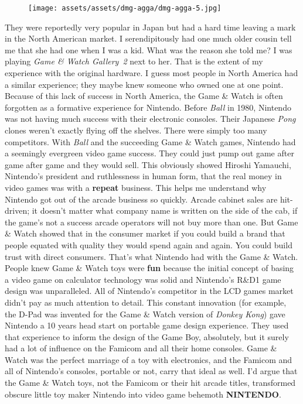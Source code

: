 \documentclass{book}
\begin{document}
\begin{figure}[hbt]
\vskip 10pt
\centering \texttt{[image: assets/assets/dmg-agga/dmg-agga-5.jpg]}
\vskip 6pt
\end{figure}
They were reportedly very popular in Japan but had a hard time leaving a mark in the North American market. I serendipitously had one much older cousin tell me that she had one when I was a kid. What was the reason she told me? I was playing \emph{Game \& Watch Gallery 2} next to her. That is the extent of my experience with the original hardware. I guess most people in North America had a similar experience; they maybe knew someone who owned one at one point. Because of this lack of success in North America, the Game \& Watch is often forgotten as a formative experience for Nintendo. Before \emph{Ball} in 1980, Nintendo was not having much success with their electronic consoles. Their Japanese \emph{Pong} clones weren’t exactly flying off the shelves. There were simply too many competitors. With \emph{Ball} and the succeeding Game \& Watch games, Nintendo had a seemingly evergreen video game success. They could just pump out game after game after game and they would sell. This obviously showed Hiroshi Yamauchi, Nintendo’s president and ruthlessness in human form, that the real money in video games was with a \textbf{repeat} business. This helps me understand why Nintendo got out of the arcade business so quickly. Arcade cabinet sales are hit-driven; it doesn’t matter what company name is written on the side of the cab, if the game’s not a success arcade operators will not buy more than one. But Game \& Watch showed that in the consumer market if you could build a brand that people equated with quality they would spend again and again. You could build trust with direct consumers. That’s what Nintendo had with the Game \& Watch. People knew Game \& Watch toys were \textbf{fun} because the initial concept of basing a video game on calculator technology was solid and Nintendo’s R\&D1 game design was unparalleled. All of Nintendo’s competitor in the LCD games market didn’t pay as much attention to detail. This constant innovation (for example, the D-Pad was invented for the Game \& Watch version of \emph{Donkey Kong}) gave Nintendo a 10 years head start on portable game design experience. They used that experience to inform the design of the Game Boy, absolutely, but it surely had a lot of influence on the Famicom and all their home consoles. Game \& Watch was the perfect marriage of a toy with electronics, and the Famicom and all of Nintendo’s consoles, portable or not, carry that ideal as well. I’d argue that the Game \& Watch toys, not the Famicom or their hit arcade titles, transformed obscure little toy maker Nintendo into video game behemoth \textbf{NINTENDO}.
\end{document}

